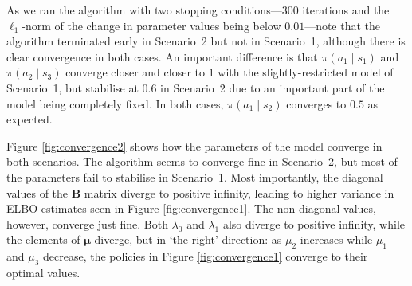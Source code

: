 \documentclass{mpaper}
\begin{document}
As we ran the algorithm with two stopping conditions---$300$ iterations and the
$\ell_1$-norm of the change in parameter values being below $0.01$---note that
the algorithm terminated early in Scenario~2 but not in Scenario~1, although
there is clear convergence in both cases. An important difference is that
$\pi(a_1 \mid s_1)$ and $\pi(a_2 \mid s_3)$ converge closer and closer to $1$
with the slightly-restricted model of Scenario~1, but stabilise at $0.6$ in
Scenario~2 due to an important part of the model being completely fixed. In both
cases, $\pi(a_1 \mid s_2)$ converges to $0.5$ as expected.

Figure \ref{fig:convergence2} shows how the parameters of the model converge in
both scenarios. The algorithm seems to converge fine in Scenario~2, but most of
the parameters fail to stabilise in Scenario~1. Most importantly, the diagonal
values of the $\mathbf{B}$ matrix diverge to positive infinity, leading to higher
variance in ELBO estimates seen in Figure \ref{fig:convergence1}. The
non-diagonal values, however, converge just fine. Both $\lambda_0$ and
$\lambda_1$ also diverge to positive infinity, while the elements of $\bm\mu$
diverge, but in `the right' direction: as $\mu_2$ increases while $\mu_1$ and
$\mu_3$ decrease, the policies in Figure \ref{fig:convergence1} converge to
their optimal values.

\end{document}
